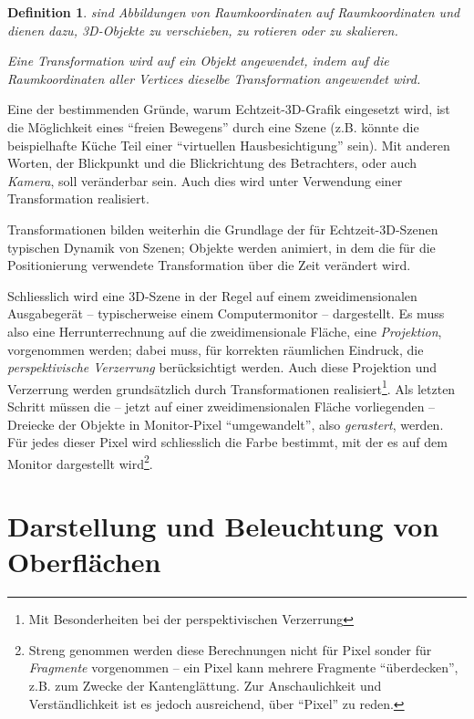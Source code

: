 \documentclass[twoside,a4paper,fleqn,12pt]{book}
\newtheorem{defn}{Definition}
\begin{document}
\begin{defn}
 sind Abbildungen von Raumkoordinaten auf Raumkoordinaten und dienen dazu,
3D-Objekte zu verschieben, zu rotieren oder zu skalieren.

Eine Transformation wird auf ein Objekt angewendet, indem auf die Raumkoordinaten aller Vertices dieselbe Transformation angewendet wird.
\end{defn}


Eine der bestimmenden Gründe, warum Echtzeit-3D-Grafik eingesetzt wird, ist die Möglichkeit eines "`freien Bewegens"' durch
eine Szene (z.B. könnte die beispielhafte Küche Teil einer "`virtuellen Hausbesichtigung"' sein).
Mit anderen Worten, der Blickpunkt und die Blickrichtung des Betrachters, oder auch \emph{Kamera}, soll veränderbar sein.
Auch dies wird unter Verwendung einer Transformation realisiert.

Transformationen bilden weiterhin die Grundlage der für Echtzeit-3D-Szenen typischen Dynamik von Szenen; Objekte werden animiert,
in dem die für die Positionierung verwendete Transformation über die Zeit verändert wird.

Schliesslich wird eine 3D-Szene in der Regel auf einem zweidimensionalen Ausgabegerät -- typischerweise einem Computermonitor --
dargestellt. Es muss also eine Herrunterrechnung auf die zweidimensionale Fläche, eine \emph{Projektion}, vorgenommen werden;
dabei muss, für korrekten räumlichen Eindruck, die \emph{perspektivische Verzerrung} berücksichtigt werden.
Auch diese Projektion und Verzerrung werden grundsätzlich durch Transformationen realisiert\footnote{Mit Besonderheiten bei der perspektivischen Verzerrung}.
Als letzten Schritt müssen die -- jetzt auf einer zweidimensionalen Fläche vorliegenden -- Dreiecke der Objekte
in Monitor-Pixel "`umgewandelt"', also \emph{gerastert}, werden. Für jedes dieser Pixel wird schliesslich die Farbe bestimmt,
mit der es auf dem Monitor dargestellt wird\footnote{Streng genommen werden diese Berechnungen nicht für Pixel sonder für \emph{Fragmente} vorgenommen --
ein Pixel kann mehrere Fragmente "`überdecken"', z.B. zum Zwecke der Kantenglättung. Zur Anschaulichkeit und Verständlichkeit ist es jedoch
ausreichend, über "`Pixel"' zu reden.}.

\section{Darstellung und Beleuchtung von Oberflächen}
\label{surface_and_shading}
\end{document}
